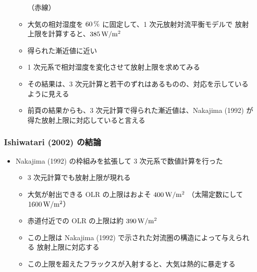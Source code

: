 \documentclass[aspectratio=149,9pt,fleqn]{beamer}
\begin{document}
\begin{frame}
\begin{itemize}
\begin{itemize}
					\textcolor[cmyk]{0,1,1,0}{（赤線）}
				\item 大気の相対湿度を \(60\hmu{\%}\) に固定して、1 次元放射対流平衡モデルで
					放射上限を計算すると、\(385\hmu{W/m^2}\)
				\item 得られた漸近値に近い
				\item 1 次元系で相対湿度を変化させて放射上限を求めてみる
				\item その結果は、3 次元計算と若干のずれはあるものの、対応を示しているように見える
				\item 前頁の結果からも、3 次元計算で得られた漸近値は、Nakajima \etal (1992)
					が得た放射上限に対応していると言える
			\end{itemize}
	\end{itemize}
\end{frame}


\begin{frame}
	\frametitle{Ishiwatari \etal (2002) の結論}
	\begin{itemize}
		\item Nakajima \etal (1992) の枠組みを拡張して 3 次元系で数値計算を行った
		\begin{itemize}
			\item 3 次元計算でも放射上限が現れる
			\item 大気が射出できる OLR の上限はおよそ \(400\hmu{W/m^2}\)
				（太陽定数にして \(1600\hmu{W/m^2}\)）
			\item 赤道付近での OLR の上限は約 \(390\hmu{W/m^2}\)
			\item この上限は Nakajima \etal (1992) で示された対流圏の構造によって与えられる
				放射上限に対応する
			\item この上限を超えたフラックスが入射すると、大気は熱的に暴走する
		\end{itemize}
	\end{itemize}
\end{frame}
\end{document}
